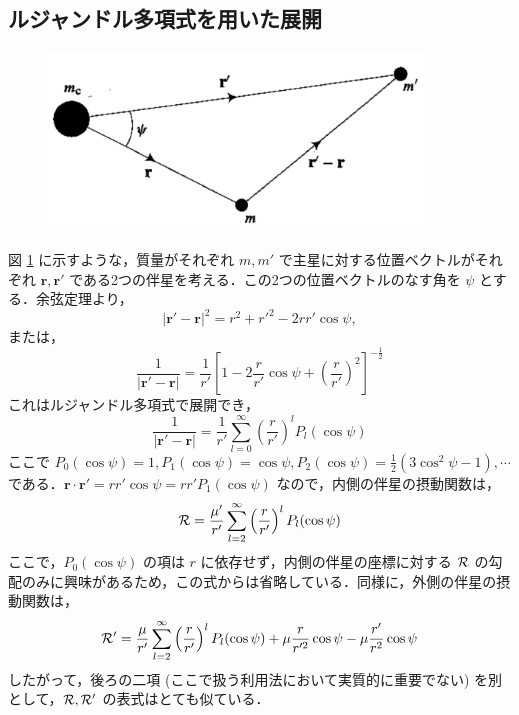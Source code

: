 \documentclass[11pt,a4paper,oneside,onecolumn]{jreport}
\begin{document}
\subsection{ルジャンドル多項式を用いた展開}
\begin{figure}[H]
\centering
\includegraphics[width=10cm]{./image/sec6_2.pdf}
\caption{\label{fig:disturbingfunc_psi}}
\end{figure}
図 \ref{fig:disturbingfunc_psi} に示すような，質量がそれぞれ $m, m'$ で主星に対する位置ベクトルがそれぞれ ${\bm r}, {\bm r'}$ である2つの伴星を考える．この2つの位置ベクトルのなす角を $\psi$ とする．余弦定理より，
\begin{equation}
|{\bm r'} - {\bm r}|^2 = r^2 + r'^2 - 2 r r' \cos \psi,
\end{equation}
または，
\begin{equation}
\frac{1}{|{\bm r'} - {\bm r}|} = \frac{1}{r'} \left[ 1 - 2 \frac{r}{r'} \cos \psi + \left( \frac{r}{r'} \right)^2 \right]^{-\frac{1}{2}}
\end{equation}
これはルジャンドル多項式で展開でき，
\begin{equation}
\frac{1}{|{\bm r'} - {\bm r}|} = \frac{1}{r'} \sum_{l = 0}^{\infty} \left( \frac{r}{r'} \right)^l P_l (\cos \psi)
\end{equation}
ここで $P_0 (\cos \psi) = 1, P_1 (\cos \psi) = \cos \psi, P_2 (\cos \psi) = \frac{1}{2} (3 \cos^2 \psi - 1), \cdots$ である．${\bm r} \cdot {\bm r'} = r r' \cos \psi = r r' P_1 (\cos \psi)$ なので，内側の伴星の摂動関数は，
\begin{equation}
{\cal R} = \frac{\mu'}{r'} \sum_{l = 2}^{\infty} \left( \frac{r}{r'} \right)^l P_l (\cos \psi) \label{eq:cal_R2}
\end{equation}
ここで，$P_0 (\cos \psi)$ の項は $r$ に依存せず，内側の伴星の座標に対する ${\cal R}$ の勾配のみに興味があるため，この式からは省略している．同様に，外側の伴星の摂動関数は，
\begin{equation}
{\cal R'} = \frac{\mu}{r'} \sum_{l = 2}^{\infty} \left( \frac{r}{r'} \right)^l P_l (\cos \psi) + \mu \frac{r}{r'^2} \cos \psi - \mu \frac{r'}{r^2} \cos \psi
\end{equation}
したがって，後ろの二項 (ここで扱う利用法において実質的に重要でない) を別として，${\cal R}, {\cal R'}$ の表式はとても似ている．
\end{document}
